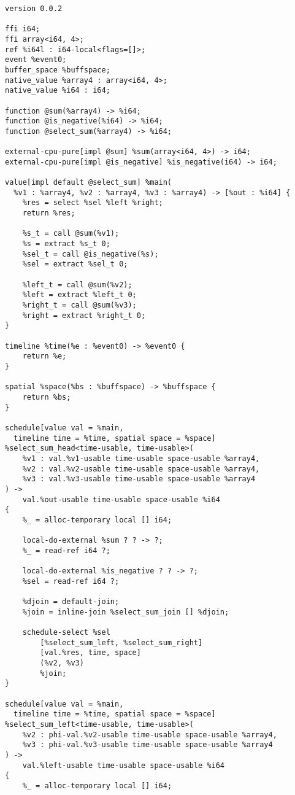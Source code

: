 \begin{lstlisting}
version 0.0.2

ffi i64;
ffi array<i64, 4>;
ref %i64l : i64-local<flags=[]>;
event %event0;
buffer_space %buffspace;
native_value %array4 : array<i64, 4>;
native_value %i64 : i64;

function @sum(%array4) -> %i64;
function @is_negative(%i64) -> %i64;
function @select_sum(%array4) -> %i64;

external-cpu-pure[impl @sum] %sum(array<i64, 4>) -> i64;
external-cpu-pure[impl @is_negative] %is_negative(i64) -> i64;

value[impl default @select_sum] %main(
  %v1 : %array4, %v2 : %array4, %v3 : %array4) -> [%out : %i64] {
    %res = select %sel %left %right;
    return %res;

    %s_t = call @sum(%v1);
    %s = extract %s_t 0;
    %sel_t = call @is_negative(%s);
    %sel = extract %sel_t 0;

    %left_t = call @sum(%v2);
    %left = extract %left_t 0;
    %right_t = call @sum(%v3);
    %right = extract %right_t 0;
}

timeline %time(%e : %event0) -> %event0 {
    return %e;
}

spatial %space(%bs : %buffspace) -> %buffspace {
    return %bs;
}

schedule[value val = %main, 
  timeline time = %time, spatial space = %space]
%select_sum_head<time-usable, time-usable>(
    %v1 : val.%v1-usable time-usable space-usable %array4,
    %v2 : val.%v2-usable time-usable space-usable %array4,
    %v3 : val.%v3-usable time-usable space-usable %array4
) -> 
    val.%out-usable time-usable space-usable %i64 
{
    %_ = alloc-temporary local [] i64;

    local-do-external %sum ? ? -> ?;
    %_ = read-ref i64 ?;

    local-do-external %is_negative ? ? -> ?;
    %sel = read-ref i64 ?;

    %djoin = default-join;
    %join = inline-join %select_sum_join [] %djoin;

    schedule-select %sel 
        [%select_sum_left, %select_sum_right] 
        [val.%res, time, space] 
        (%v2, %v3) 
        %join;
}

schedule[value val = %main, 
  timeline time = %time, spatial space = %space]
%select_sum_left<time-usable, time-usable>(
    %v2 : phi-val.%v2-usable time-usable space-usable %array4,
    %v3 : phi-val.%v3-usable time-usable space-usable %array4
) -> 
    val.%left-usable time-usable space-usable %i64
{
    %_ = alloc-temporary local [] i64;


\end{lstlisting}
